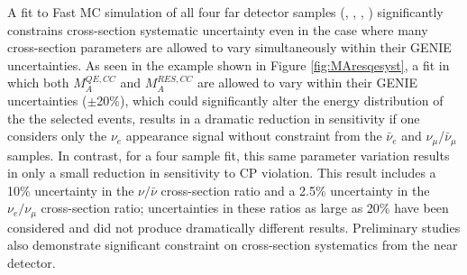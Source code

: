 A fit to Fast MC simulation of all four far detector samples
(\nue, \anue, \numu, \anumu) significantly
constrains cross-section systematic uncertainty even in the case where many
cross-section parameters are allowed to vary simultaneously within their
GENIE uncertainties. As seen in the example shown in Figure
\ref{fig:MAresqesyst}, 
a fit in which both $M_A^{QE,CC}$ and 
$M_A^{RES,CC}$ are allowed to vary within their GENIE uncertainties 
($\pm$20\%), which could significantly alter the energy distribution of the 
the selected events, results in a dramatic reduction in sensitivity if one 
considers only the $\nu_e$ appearance signal without constraint from the 
$\bar{\nu}_e$ and $\nu_{\mu}$/$\bar{\nu}_{\mu}$ samples.
In contrast, for a four sample fit,
this same parameter variation results in only a small reduction in
sensitivity to CP violation.
This result includes a 10\% uncertainty in the $\nu/\bar{\nu}$
cross-section ratio and a 2.5\% uncertainty in the $\nu_e/\nu_{\mu}$
cross-section ratio; uncertainties in these ratios as large as 20\% have
been considered and did not produce dramatically different results.
Preliminary studies also
demonstrate significant constraint on cross-section systematics from the 
near detector.
%
